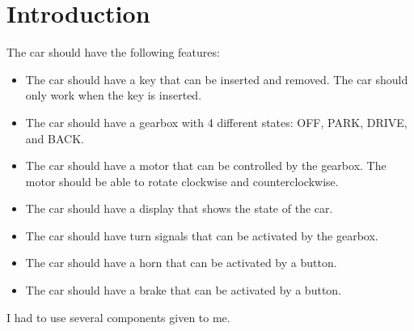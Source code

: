 \section{Introduction}
\label{sec:introduction}

The car should have the following features:
\begin{itemize}
    \item The car should have a key that can be inserted and removed. The car should only work when the key is inserted.
    \item The car should have a gearbox with 4 different states: OFF, PARK, DRIVE, and BACK.
    \item The car should have a motor that can be controlled by the gearbox. The motor should be able to rotate clockwise and counterclockwise.
    \item The car should have a display that shows the state of the car.
    \item The car should have turn signals that can be activated by the gearbox.
    \item The car should have a horn that can be activated by a button.
    \item The car should have a brake that can be activated by a button.
\end{itemize}

I had to use several components given to me.

